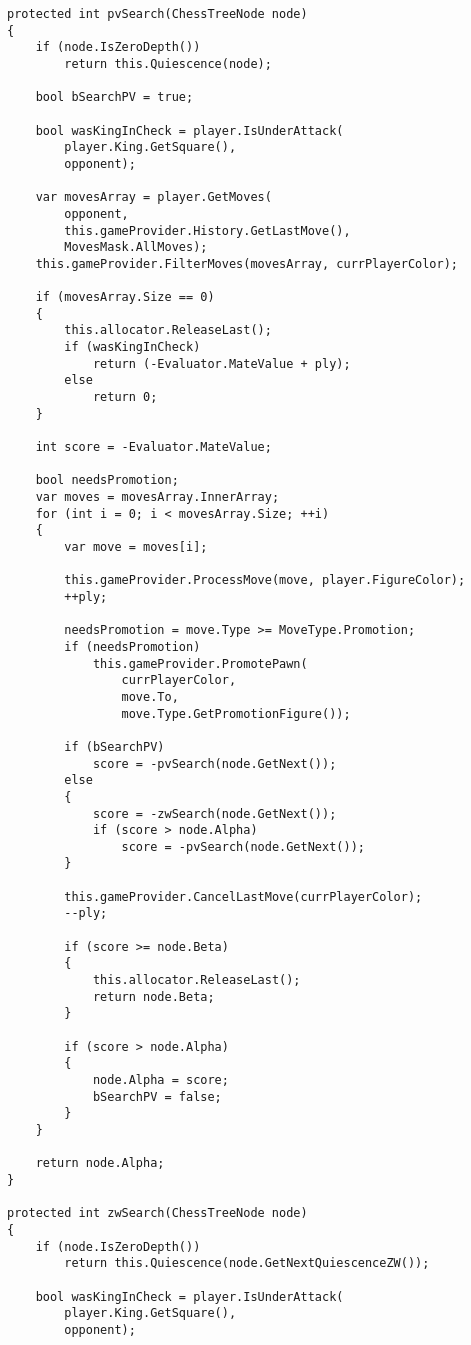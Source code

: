 \documentclass[12pt,a4paper]{article}
\begin{document}
\singlespacing
\begin{lstlisting}
protected int pvSearch(ChessTreeNode node)
{
    if (node.IsZeroDepth())
        return this.Quiescence(node);

    bool bSearchPV = true;

    bool wasKingInCheck = player.IsUnderAttack(
        player.King.GetSquare(),
        opponent);

    var movesArray = player.GetMoves(
        opponent, 
        this.gameProvider.History.GetLastMove(), 
        MovesMask.AllMoves);
    this.gameProvider.FilterMoves(movesArray, currPlayerColor);

    if (movesArray.Size == 0)
    {
        this.allocator.ReleaseLast();
        if (wasKingInCheck)
            return (-Evaluator.MateValue + ply);
        else
            return 0;
    }

    int score = -Evaluator.MateValue;

    bool needsPromotion;
    var moves = movesArray.InnerArray;
    for (int i = 0; i < movesArray.Size; ++i)
    {
        var move = moves[i];

        this.gameProvider.ProcessMove(move, player.FigureColor);
        ++ply;

        needsPromotion = move.Type >= MoveType.Promotion;
        if (needsPromotion)
            this.gameProvider.PromotePawn(
                currPlayerColor, 
                move.To, 
                move.Type.GetPromotionFigure());

        if (bSearchPV)
            score = -pvSearch(node.GetNext());
        else
        {
            score = -zwSearch(node.GetNext());
            if (score > node.Alpha)
                score = -pvSearch(node.GetNext());
        }

        this.gameProvider.CancelLastMove(currPlayerColor);
        --ply;

        if (score >= node.Beta)
        {
            this.allocator.ReleaseLast();
            return node.Beta;
        }

        if (score > node.Alpha)
        {
            node.Alpha = score;
            bSearchPV = false;
        }
    }

    return node.Alpha;
}

protected int zwSearch(ChessTreeNode node)
{
    if (node.IsZeroDepth())
        return this.Quiescence(node.GetNextQuiescenceZW());

    bool wasKingInCheck = player.IsUnderAttack(
        player.King.GetSquare(),
        opponent);


\end{lstlisting}
\end{document}
